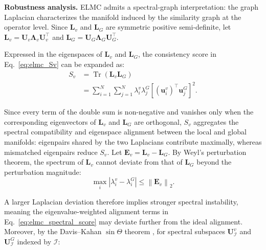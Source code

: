 \documentclass[10pt, journal, compsoc]{IEEEtran}
\newif\ifshowrevision
\newenvironment{revpar}{%
  \ifshowrevision
    \color{blue}%
  \fi
}{}
\begin{document}
\textbf{Robustness analysis.}
ELMC admits a spectral-graph interpretation: the graph Laplacian characterizes the manifold induced by the similarity graph at the operator level. Since $\mathbf{L}_{v}$ and $\mathbf{L}_{G}$ are symmetric positive semi-definite, let $\mathbf{L}_{v}=\mathbf{U}_{v}\boldsymbol{\Lambda}_{v}\mathbf{U}_{v}^{\top}$ and $\mathbf{L}_{G}=\mathbf{U}_{G}\boldsymbol{\Lambda}_{G}\mathbf{U}_{G}^{\top}$.\begin{revpar} Expressed in the eigenspaces of $\mathbf{L}_{v}$ and $\mathbf{L}_{G}$, the consistency score in Eq.~\eqref{eq:elmc_Sv} can be expanded as: \end{revpar}
\begin{equation}
\begin{aligned}
S_v
&=
\operatorname{Tr}
\left(
\mathbf{L}_{v}\mathbf{L}_{G}
\right)                                                   \\
&=
\sum_{i=1}^{N}
\sum_{j=1}^{N}
\lambda_i^{v}
\lambda_j^{G}
\left[
(\mathbf{u}_{i}^{v})^{\top}
\mathbf{u}_{j}^{G}
\right]^2 .
\end{aligned}
\label{eq:elmc_spectral_score}
\end{equation}
\begin{revpar} Since every term of the double sum is non-negative and vanishes only when the corresponding eigenvectors of $\mathbf{L}_{v}$ and $\mathbf{L}_{G}$ are orthogonal, $S_v$ aggregates the spectral compatibility and eigenspace alignment between the local and global manifolds: eigenpairs shared by the two Laplacians contribute maximally, whereas mismatched eigenpairs reduce $S_v$.
Let $\mathbf{E}_{v} = \mathbf{L}_{v} - \mathbf{L}_{G}$. By Weyl's perturbation theorem, the spectrum of $\mathbf{L}_{v}$ cannot deviate from that of $\mathbf{L}_{G}$ beyond the perturbation magnitude: \end{revpar}
\begin{equation}
\max_{i}
\left|
\lambda_i^{v}
-
\lambda_i^{G}
\right|
\leq
\left\|
\mathbf{E}_{v}
\right\|_{2}.
\label{eq:elmc_weyl_bound}
\end{equation}
\begin{revpar} A larger Laplacian deviation therefore implies stronger spectral instability, meaning the eigenvalue-weighted alignment terms in Eq.~\eqref{eq:elmc_spectral_score} may deviate further from the ideal alignment. Moreover, by the Davis--Kahan $\sin\Theta$ theorem \cite{davis1970rotation,yu2015useful}, for spectral subspaces \end{revpar} $\mathbf{U}_{\mathcal{I}}^{v}$ and $\mathbf{U}_{\mathcal{I}}^{G}$ indexed by $\mathcal{I}$:
\end{document}
